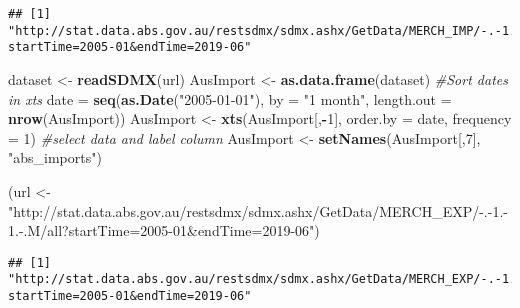 \documentclass[]{article}
\newenvironment{Shaded}{\begin{snugshade}}{\end{snugshade}}
\newcommand{\KeywordTok}[1]{\textcolor[rgb]{0.13,0.29,0.53}{\textbf{#1}}}
\newcommand{\DataTypeTok}[1]{\textcolor[rgb]{0.13,0.29,0.53}{#1}}
\newcommand{\DecValTok}[1]{\textcolor[rgb]{0.00,0.00,0.81}{#1}}
\newcommand{\StringTok}[1]{\textcolor[rgb]{0.31,0.60,0.02}{#1}}
\newcommand{\CommentTok}[1]{\textcolor[rgb]{0.56,0.35,0.01}{\textit{#1}}}
\newcommand{\OperatorTok}[1]{\textcolor[rgb]{0.81,0.36,0.00}{\textbf{#1}}}
\newcommand{\NormalTok}[1]{#1}
\begin{document}
\begin{verbatim}
## [1] "http://stat.data.abs.gov.au/restsdmx/sdmx.ashx/GetData/MERCH_IMP/-.-1.-1.-.M/all?startTime=2005-01&endTime=2019-06"
\end{verbatim}

\begin{Shaded}
\begin{Highlighting}[]
\NormalTok{dataset <-}\StringTok{ }\KeywordTok{readSDMX}\NormalTok{(url)}
\NormalTok{AusImport <-}\StringTok{ }\KeywordTok{as.data.frame}\NormalTok{(dataset)}
\CommentTok{#Sort dates in xts}
\NormalTok{date =}\StringTok{ }\KeywordTok{seq}\NormalTok{(}\KeywordTok{as.Date}\NormalTok{(}\StringTok{"2005-01-01"}\NormalTok{), }\DataTypeTok{by =} \StringTok{"1 month"}\NormalTok{, }
           \DataTypeTok{length.out =} \KeywordTok{nrow}\NormalTok{(AusImport))}
\NormalTok{AusImport <-}\StringTok{ }\KeywordTok{xts}\NormalTok{(AusImport[,}\OperatorTok{-}\DecValTok{1}\NormalTok{], }\DataTypeTok{order.by =}\NormalTok{ date, }\DataTypeTok{frequency =} \DecValTok{1}\NormalTok{)}
\CommentTok{#select data and label column}
\NormalTok{AusImport <-}\StringTok{  }\KeywordTok{setNames}\NormalTok{(AusImport[,}\DecValTok{7}\NormalTok{], }\StringTok{"abs_imports"}\NormalTok{)}

\NormalTok{(url <-}\StringTok{ "http://stat.data.abs.gov.au/restsdmx/sdmx.ashx/GetData/MERCH_EXP/-.-1.-1.-.M/all?startTime=2005-01&endTime=2019-06"}\NormalTok{)}
\end{Highlighting}
\end{Shaded}

\begin{verbatim}
## [1] "http://stat.data.abs.gov.au/restsdmx/sdmx.ashx/GetData/MERCH_EXP/-.-1.-1.-.M/all?startTime=2005-01&endTime=2019-06"
\end{verbatim}
\end{document}
